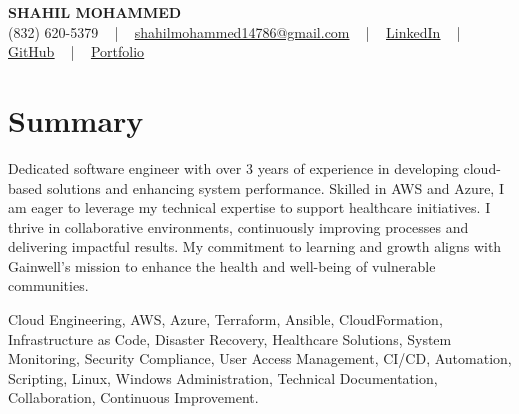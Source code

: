 \documentclass[letterpaper,10pt]{article}
\begin{document}
\begin{center}
    {\fontsize{14pt}{12pt}\selectfont \textbf{\MakeUppercase{Shahil Mohammed}}}\\ \vspace{2pt}
    \fontsize{10pt}{12pt}\selectfont (832) 620-5379 ~ | ~ \href{mailto:shahilmohammed14786@gmail.com}{shahilmohammed14786@gmail.com} ~ | ~  
    \href{https://www.linkedin.com/in/shahil-mohammed-9652931a1/}{\color{blue}\underline{LinkedIn}}  ~ | ~ 
    \href{https://github.com/freakbeast14}{\color{blue}\underline{GitHub}} ~ | ~ 
    \href{https://shahil-mohammed.netlify.app/}{\color{blue}\underline{Portfolio}}
    \vspace{-8pt}
\end{center}

\section{Summary}
\vspace{-2pt}\fontsize{8pt}{9pt}\selectfont
Dedicated software engineer with over 3 years of experience in developing cloud-based solutions and enhancing system performance. Skilled in AWS and Azure, I am eager to leverage my technical expertise to support healthcare initiatives. I thrive in collaborative environments, continuously improving processes and delivering impactful results. My commitment to learning and growth aligns with Gainwell's mission to enhance the health and well-being of vulnerable communities. 
\vspace{-5pt}
 
{\fontsize{1pt}{1pt}\selectfont\color{white}
Cloud Engineering, AWS, Azure, Terraform, Ansible, CloudFormation, Infrastructure as Code, Disaster Recovery, Healthcare Solutions, System Monitoring, Security Compliance, User Access Management, CI/CD, Automation, Scripting, Linux, Windows Administration, Technical Documentation, Collaboration, Continuous Improvement.
}
\vspace{-8pt}

\vspace{-2pt}
\end{document}
